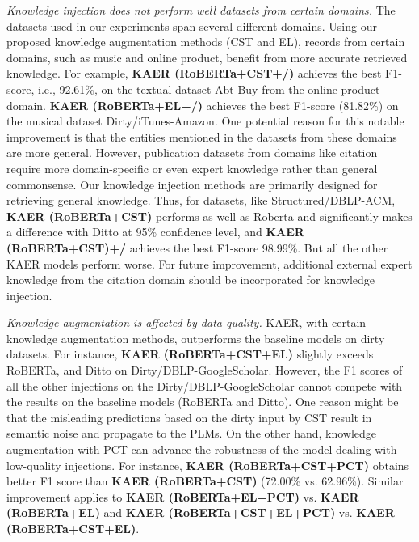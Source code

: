 \textit{Knowledge injection does not perform well datasets from certain domains.}
The datasets used in our experiments span several different domains. Using our proposed knowledge augmentation methods (CST and EL), records from certain domains, such as music and online product, benefit from more accurate retrieved knowledge.
For example, \textbf{KAER (RoBERTa+CST+/)} achieves the best F1-score, i.e., 92.61\%, on the textual dataset Abt-Buy from the online product domain.
\textbf{KAER (RoBERTa+EL+/)} achieves the best F1-score (81.82\%) on the musical dataset Dirty/iTunes-Amazon. %
One potential reason for this notable improvement is that the entities mentioned in the datasets from these domains are more general.
However, publication datasets from domains like citation require more domain-specific or even expert knowledge rather than general commonsense. Our knowledge injection methods are primarily designed for retrieving general knowledge.
Thus, for datasets, like Structured/DBLP-ACM, \textbf{KAER (RoBERTa+CST)} performs as well as Roberta and significantly makes a difference with Ditto at 95\% confidence level, and \textbf{KAER (RoBERTa+CST)+/}  achieves the best F1-score 98.99\%. But all the other KAER models perform worse. For future improvement, additional external expert knowledge from the citation domain should be incorporated for knowledge injection. 

\textit{Knowledge augmentation is affected by data quality.}
KAER, with certain knowledge augmentation methods, outperforms the baseline models on dirty datasets. For instance, \textbf{KAER (RoBERTa+CST+EL)} slightly exceeds RoBERTa, and Ditto on Dirty/DBLP-GoogleScholar.
However, the F1 scores of all the other injections on the Dirty/DBLP-GoogleScholar cannot compete with the results on the baseline models (RoBERTa and Ditto). One reason might be that the misleading predictions based on the dirty input by CST result in semantic noise and propagate to the PLMs.
On the other hand, knowledge augmentation with PCT can advance the robustness of the model dealing with low-quality injections. For instance, \textbf{KAER (RoBERTa+CST+PCT)} obtains better F1 score than \textbf{KAER (RoBERTa+CST)} (72.00\% vs. 62.96\%). 
Similar improvement applies to \textbf{KAER (RoBERTa+EL+PCT)} vs. \textbf{KAER (RoBERTa+EL)} %
and  \textbf{KAER (RoBERTa+CST+EL+PCT)} vs. \textbf{KAER (RoBERTa+CST+EL)}. %

